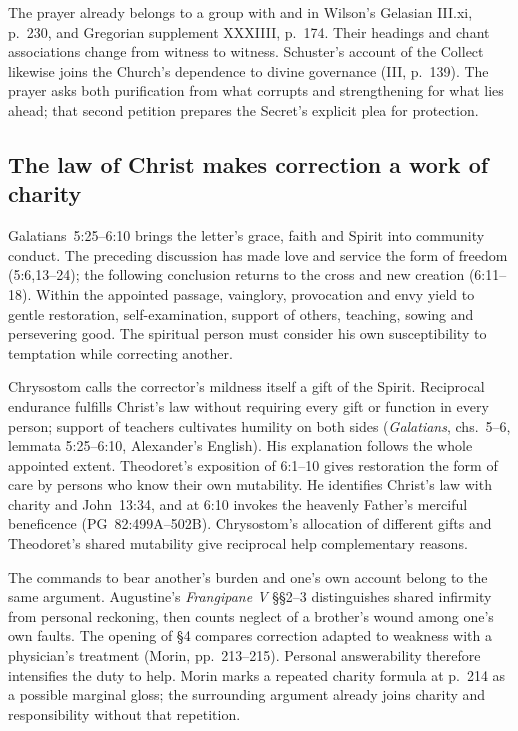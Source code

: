 The prayer already belongs to a group with  and
 in Wilson's Gelasian III.xi, p.~230, and Gregorian
supplement XXXIIII, p.~174. Their headings and chant associations change
from witness to witness. Schuster's account of the Collect likewise
joins the Church's dependence to divine governance (III, p.~139).
The prayer asks both purification from what corrupts and strengthening for
what lies ahead; that second petition prepares the Secret's explicit plea
for protection.

\subsection*{The law of Christ makes correction a work of charity\enspace{}}

Galatians~5:25--6:10 brings the letter's grace, faith and Spirit into
community conduct. The preceding discussion has made love and service the
form of freedom (5:6,13--24); the following conclusion returns to the cross
and new creation (6:11--18). Within the appointed passage, vainglory,
provocation and envy yield to gentle restoration, self-examination, support
of others, teaching, sowing and persevering good. The spiritual person must
consider his own susceptibility to temptation while correcting another.

Chrysostom calls the corrector's mildness itself a gift of the Spirit.
Reciprocal endurance fulfills Christ's law without requiring every gift or
function in every person; support of teachers cultivates humility on both
sides (\emph{Galatians}, chs.~5--6, lemmata 5:25--6:10,
Alexander's English). His explanation follows the whole appointed extent.
Theodoret's exposition of 6:1--10 gives restoration the form of care by
persons who know their own mutability. He identifies Christ's law with
charity and John~13:34, and at 6:10 invokes the heavenly Father's merciful
beneficence (PG~82:499A--502B). Chrysostom's allocation of different gifts
and Theodoret's shared mutability give reciprocal help complementary
reasons.

The commands to bear another's burden and one's own account belong to the
same argument. Augustine's \emph{Frangipane V} §§2--3 distinguishes shared
infirmity from personal reckoning, then counts neglect of a brother's wound
among one's own faults. The opening of §4 compares correction adapted to
weakness with a physician's treatment (Morin, pp.~213--215). Personal
answerability therefore intensifies the duty to help. Morin marks a repeated
charity formula at p.~214 as a possible marginal gloss; the surrounding
argument already joins charity and responsibility without that repetition.

